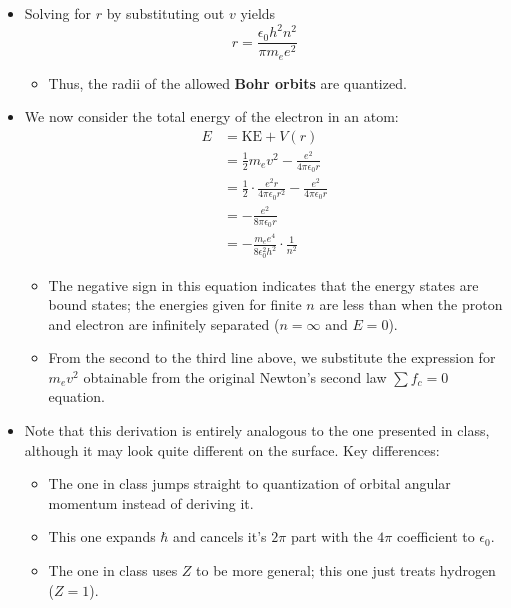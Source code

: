 \documentclass[../notes.tex]{subfiles}
\begin{document}
\begin{itemize}
\begin{itemize}
\begin{itemize}
        \end{itemize}
        \item Solving for $r$ by substituting out $v$ yields
        \begin{equation*}
            r = \frac{\epsilon_0h^2n^2}{\pi m_ee^2}
        \end{equation*}
        \begin{itemize}
            \item Thus, the radii of the allowed \textbf{Bohr orbits} are quantized.
        \end{itemize}
        \item We now consider the total energy of the electron in an atom:
        \begin{align*}
            E &= \text{KE}+V(r)\\
            &= \frac{1}{2}m_ev^2-\frac{e^2}{4\pi\epsilon_0r}\\
            &= \frac{1}{2}\cdot\frac{e^2r}{4\pi\epsilon_0r^2}-\frac{e^2}{4\pi\epsilon_0r}\\
            &= -\frac{e^2}{8\pi\epsilon_0r}\\
            &= -\frac{m_ee^4}{8\epsilon_0^2h^2}\cdot\frac{1}{n^2}
        \end{align*}
        \begin{itemize}
            \item The negative sign in this equation indicates that the energy states are bound states; the energies given for finite $n$ are less than when the proton and electron are infinitely separated ($n=\infty$ and $E=0$).
            \item From the second to the third line above, we substitute the expression for $m_ev^2$ obtainable from the original Newton's second law $\sum f_c=0$ equation.
        \end{itemize}
        \item Note that this derivation is entirely analogous to the one presented in class, although it may look quite different on the surface. Key differences:
        \begin{itemize}
            \item The one in class jumps straight to quantization of orbital angular momentum instead of deriving it.
            \item This one expands $\hbar$ and cancels it's $2\pi$ part with the $4\pi$ coefficient to $\epsilon_0$.
            \item The one in class uses $Z$ to be more general; this one just treats hydrogen ($Z=1$).

\end{itemize}
\end{itemize}
\end{itemize}
\end{document}
